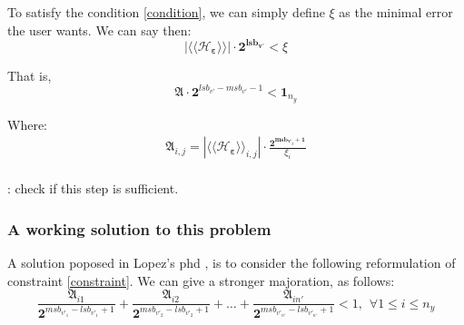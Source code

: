 		To satisfy the condition \ref{condition}, we can simply define $\xi$ as the minimal error the user wants.
		We can say then:
		\begin{equation}
			| \langle\langle \mathcal{H}_{\boldsymbol{\varepsilon}} \rangle\rangle| \cdot \boldsymbol{2^{lsb_{v'}}} < \xi
		\end{equation}

		That is, 
		\begin{equation}
			\boldsymbol{\mathfrak{A}} \cdot \boldsymbol{2}^{lsb_{v'}-msb_{v'}-1} < \boldsymbol{1}_{n_y}
		\end{equation}

		Where:
		\begin{eqnarray} \label{constraint}
			\boldsymbol{\mathfrak{A}}_{i,j}= | \langle\langle \mathcal{H}_{\boldsymbol{\varepsilon}} \rangle\rangle_{i,j} | \cdot \frac{\boldsymbol{2^{msb_{v'_j}+1}}}{\xi_i} \\
		\end{eqnarray}

		\TODO: check if this step is sufficient.

		\subsubsection{A working solution to this problem}
		A solution poposed in Lopez's phd \cite{}, is to consider the following reformulation of constraint \ref{constraint}.
		We can give a stronger majoration, as follows:
		\begin{equation}
			\frac{\mathfrak{A}_{i1}}{\boldsymbol{2}^{msb_{v'_1}-lsb_{v'_1}+1}} + \frac{\mathfrak{A}_{i2}}{\boldsymbol{2}^{msb_{v'_2}-lsb_{v'_2}+1}} + \dots + \frac{\mathfrak{A}_{in'}}{\boldsymbol{2}^{msb_{v'_{n'}}-lsb_{v'_{n'}}+1}} < 1, \hspace{5pt} \forall 1 \leq i \leq n_y 
		\end{equation}
		











